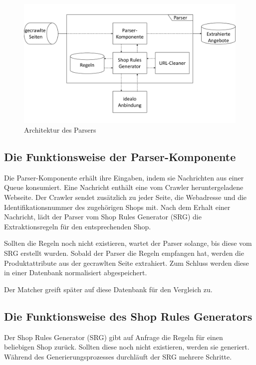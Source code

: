 \begin{figure}[H]
    \centering
    \includegraphics[width=13cm, trim=0 1.7cm 0 1.7cm, clip]{resources/Architektur-Parser.pdf}
    \caption{Architektur des Parsers}
    \label{abb:architektur-parser}
\end{figure}

\subsection{Die Funktionsweise der Parser-Komponente}
\label{subsec:funktionsweise-parser}

Die Parser-Komponente erhält ihre Eingaben, indem sie Nachrichten aus einer Queue konsumiert.
Eine Nachricht enthält eine vom Crawler heruntergeladene Webseite.
Der Crawler sendet zusätzlich zu jeder Seite, die Webadresse und die Identifikationsnummer des zugehörigen Shops mit.
Nach dem Erhalt einer Nachricht, lädt der Parser vom Shop Rules Generator (SRG) die Extraktionsregeln für den
entsprechenden Shop.

Sollten die Regeln noch nicht existieren, wartet der Parser solange, bis diese vom SRG erstellt wurden.
Sobald der Parser die Regeln empfangen hat, werden die Produktattribute aus der gecrawlten Seite extrahiert.
Zum Schluss werden diese in einer Datenbank normalisiert abgespeichert.

Der Matcher greift später auf diese Datenbank für den Vergleich zu.

\subsection{Die Funktionsweise des Shop Rules Generators}
\label{subsec:funktionsweise-srg}

Der Shop Rules Generator (SRG) gibt auf Anfrage die Regeln für einen beliebigen Shop zurück.
Sollten diese noch nicht existieren, werden sie generiert.
Während des Generierungsprozesses durchläuft der SRG mehrere Schritte.

